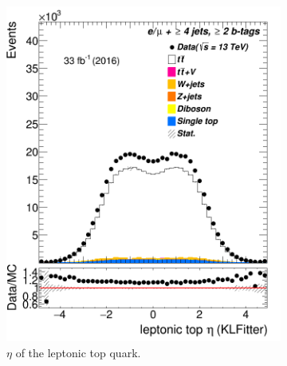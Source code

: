 \begin{figure} %
	\centering

	\begin{subfigure}{0.25\textwidth}
		\includegraphics[width=\linewidth]{ControlPlots_emujets_2016_4incl_2incl/klf_topLep_eta_emujets_2016.png}
		\caption{$\eta$ of the leptonic top quark.} \label{fig:K12}
	\end{subfigure}	\hspace*{0.5cm}
	\begin{subfigure}{0.25\textwidth}

\end{subfigure}
\end{figure}

